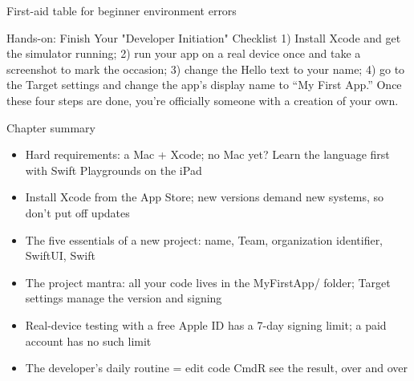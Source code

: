 \begin{center}\small\color{gray}First-aid table for beginner environment errors\end{center}

\begin{tcbpractice}{Hands-on: Finish Your "Developer Initiation" Checklist}
1) Install Xcode and get the simulator running; 2) run your app on a real device once and take a screenshot to mark the occasion; 3) change the Hello text to your name; 4) go to the Target settings and change the app's display name to “My First App.” Once these four steps are done, you're officially someone with a creation of your own.

\end{tcbpractice}

\begin{tcbsummary}{Chapter summary}
\begin{itemize}
  \item Hard requirements: a Mac + Xcode; no Mac yet? Learn the language first with Swift Playgrounds on the iPad
  \item Install Xcode from the App Store; new versions demand new systems, so don't put off updates
  \item The five essentials of a new project: name, Team, organization identifier, SwiftUI, Swift
  \item The project mantra: all your code lives in the MyFirstApp/ folder; Target settings manage the version and signing
  \item Real-device testing with a free Apple ID has a 7-day signing limit; a paid account has no such limit
  \item The developer's daily routine = edit code CmdR see the result, over and over
\end{itemize}

\end{tcbsummary}
